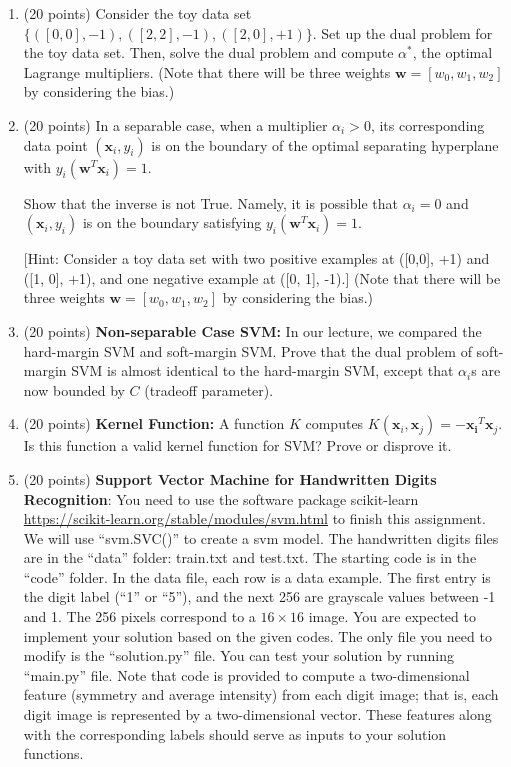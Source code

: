 \documentclass[11pt]{article}
\begin{document}
\begin{enumerate}

\item (20 points) Consider the toy data set $\{([0, 0], -1),
([2, 2], -1), ([2, 0], +1)\}$. Set up the dual problem for
the toy data set. Then, solve the dual problem and compute
$\alpha^*$, the optimal Lagrange multipliers. (Note that there will
be three weights $\boldsymbol w = [w_0, w_1, w_2]$ by considering
the bias.)

\item (20 points) In a separable case, when a multiplier
$\alpha_i > 0$, its corresponding data point $(\boldsymbol x_i,
y_i)$ is on the boundary of the optimal separating hyperplane
with $y_i(\boldsymbol w^T \boldsymbol x_i) = 1$.

Show that the inverse is not True. Namely, it is possible that
$\alpha_i = 0$ and $(\boldsymbol x_i, y_i)$ is on the boundary
satisfying $y_i(\boldsymbol w^T \boldsymbol x_i) = 1$.

[Hint: Consider a toy data set with two positive examples at
([0,0], +1) and ([1, 0], +1), and one negative example at ([0,
1], -1).] (Note that there will be three weights $\boldsymbol w =
[w_0, w_1, w_2]$ by considering the bias.)

\item (20 points) \textbf{Non-separable Case SVM:} In our lecture, we compared the hard-margin SVM and soft-margin SVM.
Prove that the dual problem of soft-margin SVM is almost
identical to the hard-margin SVM, except that $\alpha_i$s are
now bounded by $C$ (tradeoff parameter).

\item (20 points) \textbf{Kernel Function:} A function $K$
computes $K(\boldsymbol x_i, \boldsymbol x_j) =
-\boldsymbol{x_i}^T \boldsymbol x_j $. Is this function a valid
kernel function for SVM? Prove or disprove it.



\item (20 points) \textbf{Support Vector Machine for Handwritten
Digits Recognition}: You need to use the software package
scikit-learn
\href{https://scikit-learn.org/stable/modules/svm.html}{https://scikit-learn.org/stable/modules/svm.html}
to finish this assignment. We will use ``svm.SVC()'' to create a
svm model. The handwritten digits files are in the ``data''
folder: train.txt and test.txt. The starting code is in the
``code'' folder. In the data file, each row is a data example.
The first entry is the digit label (``1'' or ``5''), and the next
256 are grayscale values between -1 and 1. The 256 pixels
correspond to a $16\times16$ image. You are expected to implement
your solution based on the given codes. The only file you need to
modify is the ``solution.py'' file. You can test your solution by
running ``main.py'' file. Note that code is provided to compute a
two-dimensional feature (symmetry and average intensity) from
each digit image; that is, each digit image is represented by a
two-dimensional vector. These features along with the
corresponding labels should serve as inputs to your solution
functions.


\end{enumerate}
\end{document}
